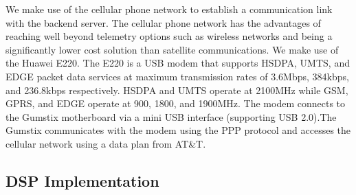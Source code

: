 \documentclass[conference]{IEEEtran}
\begin{document}


 

We make use of the cellular phone network to establish a communication
link with the backend server. The cellular phone network has the
advantages of reaching well beyond telemetry options such as wireless
networks and being a significantly lower cost solution than satellite
communications. We make use of the Huawei E220. The E220 is a USB
modem that supports HSDPA, UMTS, and EDGE packet data services at
maximum transmission rates of 3.6Mbps, 384kbps, and 236.8kbps
respectively.  HSDPA and UMTS operate at 2100MHz while GSM, GPRS, and
EDGE operate at 900, 1800, and 1900MHz. The modem connects to the
Gumstix motherboard via a mini USB interface (supporting USB 2.0).The
Gumstix communicates with the modem using the PPP protocol and
accesses the cellular network using a data plan from AT\&T.



\subsection{DSP Implementation}
\end{document}
